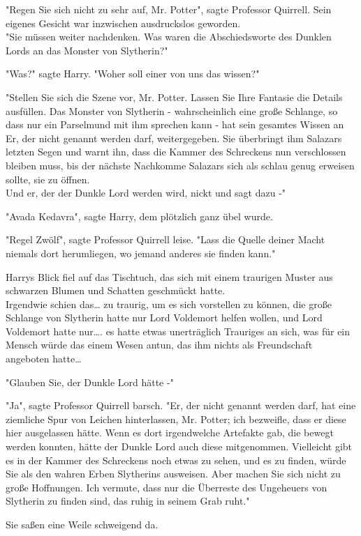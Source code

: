 {"Regen Sie sich nicht zu sehr auf, Mr. Potter", sagte Professor Quirrell. Sein eigenes Gesicht war inzwischen ausdruckslos geworden.\\ "Sie müssen weiter nachdenken. Was waren die Abschiedsworte des Dunklen Lords an das Monster von Slytherin?"

"Was?" sagte Harry. "Woher soll einer von uns das wissen?"

"Stellen Sie sich die Szene vor, Mr. Potter. Lassen Sie Ihre Fantasie die Details ausfüllen. Das Monster von Slytherin - wahrscheinlich eine große Schlange, so dass nur ein Parselmund mit ihm sprechen kann - hat sein gesamtes Wissen an Er, der nicht genannt werden darf, weitergegeben. Sie überbringt ihm Salazars letzten Segen und warnt ihn, dass die Kammer des Schreckens nun verschlossen bleiben muss, bis der nächste Nachkomme Salazars sich als schlau genug erweisen sollte, sie zu öffnen.\\ Und er, der der Dunkle Lord werden wird, nickt und sagt dazu -"

"Avada Kedavra", sagte Harry, dem plötzlich ganz übel wurde.

"Regel Zwölf", sagte Professor Quirrell leise. "Lass die Quelle deiner Macht niemals dort herumliegen, wo jemand anderes sie finden kann."

Harrys Blick fiel auf das Tischtuch, das sich mit einem traurigen Muster aus schwarzen Blumen und Schatten geschmückt hatte.\\ Irgendwie schien das… zu traurig, um es sich vorstellen zu können, die große Schlange von Slytherin hatte nur Lord Voldemort helfen wollen, und Lord Voldemort hatte nur…. es hatte etwas unerträglich Trauriges an sich, was für ein Mensch würde das einem Wesen antun, das ihm nichts als Freundschaft angeboten hatte…

"Glauben Sie, der Dunkle Lord hätte -"

"Ja", sagte Professor Quirrell barsch. "Er, der nicht genannt werden darf, hat eine ziemliche Spur von Leichen hinterlassen, Mr. Potter; ich bezweifle, dass er diese hier ausgelassen hätte. Wenn es dort irgendwelche Artefakte gab, die bewegt werden konnten, hätte der Dunkle Lord auch diese mitgenommen. Vielleicht gibt es in der Kammer des Schreckens noch etwas zu sehen, und es zu finden, würde Sie als den wahren Erben Slytherins ausweisen. Aber machen Sie sich nicht zu große Hoffnungen. Ich vermute, dass nur die Überreste des Ungeheuers von Slytherin zu finden sind, das ruhig in seinem Grab ruht."

Sie saßen eine Weile schweigend da.

}
